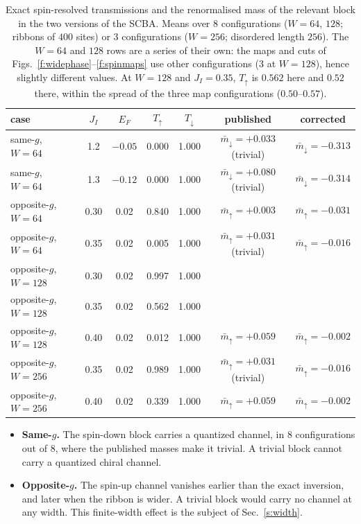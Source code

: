 \documentclass[11pt,a4paper]{article}
\newcommand{\up}{{\uparrow}}
\newcommand{\dn}{{\downarrow}}
\begin{document}
\begin{table}[t]
\centering
\caption{\label{t:spin}Exact spin-resolved transmissions and the renormalised mass of the relevant
block in the two versions of the SCBA. Means over 8 configurations ($W=64$, $128$; ribbons of
$400$ sites) or 3 configurations ($W=256$; disordered length $256$). The $W=64$ and $128$ rows
are a series of their own: the maps and cuts of Figs.~\ref{f:widephase}--\ref{f:spinmaps} use
other configurations (3 at $W=128$), hence slightly different values. At $W=128$ and
$J_I=0.35$, $T_\up$ is $0.562$ here and $0.52$ there, within the spread of the three map
configurations ($0.50$--$0.57$).}
\begin{tabular}{lcccccc}
\toprule
case & $J_I$ & $E_F$ & $T_\up$ & $T_\dn$ & published & corrected\\
\midrule
same-$g$, $W=64$ & 1.2 & $-0.05$ & 0.000 & 1.000 & $\bar m_\dn=+0.033$ (trivial) & $\bar m_\dn=-0.313$\\
same-$g$, $W=64$ & 1.3 & $-0.12$ & 0.000 & 1.000 & $\bar m_\dn=+0.080$ (trivial) & $\bar m_\dn=-0.314$\\
opposite-$g$, $W=64$ & 0.30 & 0.02 & 0.840 & 1.000 & $\bar m_\up=+0.003$ & $\bar m_\up=-0.031$\\
opposite-$g$, $W=64$ & 0.35 & 0.02 & 0.005 & 1.000 & $\bar m_\up=+0.031$ (trivial) & $\bar m_\up=-0.016$\\
opposite-$g$, $W=128$ & 0.30 & 0.02 & 0.997 & 1.000 & & \\
opposite-$g$, $W=128$ & 0.35 & 0.02 & 0.562 & 1.000 & & \\
opposite-$g$, $W=128$ & 0.40 & 0.02 & 0.012 & 1.000 & $\bar m_\up=+0.059$ & $\bar m_\up=-0.002$\\
opposite-$g$, $W=256$ & 0.35 & 0.02 & 0.989 & 1.000 & $\bar m_\up=+0.031$ (trivial) & $\bar m_\up=-0.016$\\
opposite-$g$, $W=256$ & 0.40 & 0.02 & 0.339 & 1.000 & $\bar m_\up=+0.059$ & $\bar m_\up=-0.002$\\
\bottomrule
\end{tabular}
\end{table}

\begin{itemize}
\item \textbf{Same-$g$.} The spin-down block carries a quantized channel, in 8 configurations out
  of 8, where the published masses make it trivial. A trivial block cannot carry a quantized
  chiral channel.
\item \textbf{Opposite-$g$.} The spin-up channel vanishes earlier than the exact inversion, and
  later when the ribbon is wider. A trivial block would carry no channel at any width. This
  finite-width effect is the subject of Sec.~\ref{s:width}.
\end{itemize}
\end{document}
